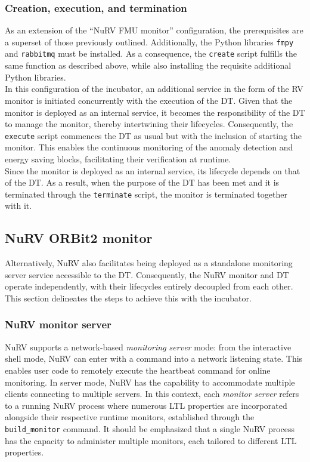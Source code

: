 \subsubsection{Creation, execution, and termination}
As an extension of the ``NuRV FMU monitor'' configuration, the prerequisites are a superset of those previously outlined.
Additionally, the Python libraries \lstinline{fmpy} and \lstinline{rabbitmq} must be installed.
As a consequence, the \texttt{create} script fulfills the same function as described above, while also installing the requisite additional Python libraries.\\
In this configuration of the incubator, an additional service in the form of the RV monitor is initiated concurrently with the execution of the DT.
Given that the monitor is deployed as an internal service, it becomes the responsibility of the DT to manage the monitor, thereby intertwining their lifecycles.
Consequently, the \texttt{execute} script commences the DT as usual but with the inclusion of starting the monitor.
This enables the continuous monitoring of the anomaly detection and energy saving blocks, facilitating their verification at runtime.\\
Since the monitor is deployed as an internal service, its lifecycle depends on that of the DT.
As a result, when the purpose of the DT has been met and it is terminated through the \texttt{terminate} script, the monitor is terminated together with it.

\subsection{NuRV ORBit2 monitor}\label{subsec:NuRVORBIT}
Alternatively, NuRV also facilitates being deployed as a standalone monitoring server service accessible to the DT.
Consequently, the NuRV monitor and DT operate independently, with their lifecycles entirely decoupled from each other.
This section delineates the steps to achieve this with the incubator.

\subsubsection{NuRV monitor server}
NuRV supports a network-based \textit{monitoring server} mode: from the interactive shell mode, NuRV can enter with a command into a network listening state. This enables user code to remotely execute the heartbeat command for online monitoring.
In server mode, NuRV has the capability to accommodate multiple clients connecting to multiple servers. In this context, each \textit{monitor server} refers to a running NuRV process where numerous LTL properties are incorporated alongside their respective runtime monitors, established through the \texttt{build\_monitor} command. It should be emphasized that a single NuRV process has the capacity to administer multiple monitors, each tailored to different LTL properties.


